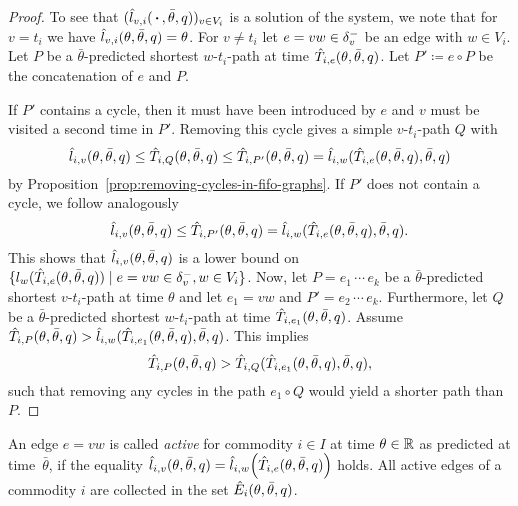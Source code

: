 \begin{proof}
    To see that $(\hat l_{v,i}(\,\boldsymbol{\cdot}\,,\bar\theta, q))_{v\in V_i}$ is a solution of the system, we note that for $v = t_i$ we have $\hat l_{v,i}(\theta, \bar\theta,q) = \theta$.
    For $v\neq t_i$ let $e=vw\in\delta^-_{v}$ be an edge with $w\in V_i$.
    Let $P$ be a $\bar\theta$-predicted shortest $w$-$t_i$-path at time $\hat T_{i,e}(\theta,\bar\theta, q)$.
    Let $P'\coloneqq e\circ P$ be the concatenation of $e$ and $P$.

    If $P'$ contains a cycle, then it must have been introduced by $e$ and $v$ must be visited a second time in $P'$.
    Removing this cycle gives a simple $v$-$t_i$-path $Q$ with 
    \[
        \hat l_{i,v}(\theta,\bar\theta,q) \leq \hat T_{i,Q}(\theta,\bar\theta,q)\leq \hat T_{i,P'}(\theta,\bar\theta,q) = \hat l_{i,w}(\hat T_{i,e}(\theta,\bar\theta, q),\bar\theta,q)
    \]
    by Proposition~\ref{prop:removing-cycles-in-fifo-graphs}.
    If $P'$ does not contain a cycle, we follow analogously
    \[
        \hat l_{i,v}(\theta,\bar\theta,q) \leq \hat T_{i,P'}(\theta,\bar\theta,q) = \hat l_{i,w}(\hat T_{i,e}(\theta,\bar\theta, q),\bar\theta,q).
    \]
    This shows that $\hat l_{i,v}(\theta,\bar\theta,q)$ is a lower bound on $\{ l_w(
        \hat T_{i, e}(\theta, \bar\theta, q)
    ) \mid e=vw\in\delta^-_{v}, w\in V_i  \}$.
    Now, let $P = e_1\, \cdots\, e_k$ be a $\bar\theta$-predicted shortest $v$-$t_i$-path at time $\theta$ and let $e_1=vw$ and $P' = e_2\,\cdots\,e_k$.
    Furthermore, let $Q$ be a $\bar\theta$-predicted shortest $w$-$t_i$-path at time $\hat T_{i,e_1}(\theta,\bar\theta,q)$.
    Assume $\hat T_{i,P}(\theta,\bar\theta, q) > \hat l_{i,w}(\hat T_{i,e_1}(\theta,\bar\theta,q), \bar\theta, q)$.
    This implies
    \[
        \hat T_{i,P}(\theta,\bar\theta, q) > 
        \hat T_{i,Q}(\hat T_{i,e_1}(\theta,\bar\theta,q), \bar\theta, q),
    \]
    such that removing any cycles in the path $e_1\circ Q$ would yield a shorter path than $P$.

\end{proof}

An edge $e=vw$ is called \emph{active} for commodity $i\in I$ at time $\theta\in\mathbb{R}$ as predicted at time~$\bar\theta$, if the equality $\hat l_{i,v}(\theta, \bar\theta, q) = \hat l_{i,w}{\left(
        \hat T_{i, e}(\theta, \bar\theta, q)
    \right)}$ holds.
All active edges of a commodity $i$ are collected in the set $\hat E_i(\theta, \bar\theta, q)$. 

